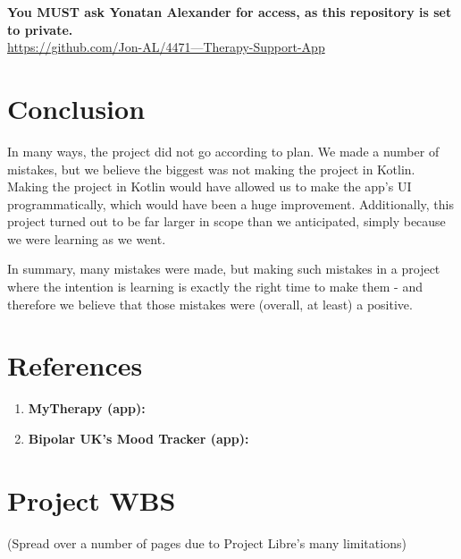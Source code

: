 \documentclass[11pt]{article}
\begin{document}
    \textbf{You MUST ask Yonatan Alexander for access, as this repository is set to private.}\\

    \href{Group Therapy-Support-App}{https://github.com/Jon-AL/4471---Therapy-Support-App}

    \pagebreak


    \section{Conclusion}\label{sec:conclusion}

    In many ways, the project did not go according to plan.
    We made a number of mistakes, but we believe the biggest was not making the project in Kotlin.
    Making the project in Kotlin would have allowed us to make the app's UI programmatically, which would have been a huge improvement.
    Additionally, this project turned out to be far larger in scope than we anticipated, simply because we were learning as we went.

    In summary, many mistakes were made, but making such mistakes in a project where the intention is learning is exactly the right time to make them - and therefore we believe that those mistakes were (overall, at least) a positive.

    \pagebreak


    \section{References}\label{sec:reference}

    \begin{enumerate}
        \item \textbf{MyTherapy (app):} \cite{MyTherapy}
        \item \textbf{Bipolar UK’s Mood Tracker (app):} \cite{BiPolUK}
    \end{enumerate}

    

    \printbibliography[heading=subbibintoc]
    \pagebreak

    \appendix
    \appendixpage

    \section{Project WBS}\label{sec:project-wbs}
    (Spread over a number of pages due to Project Libre's many limitations)
\end{document}
